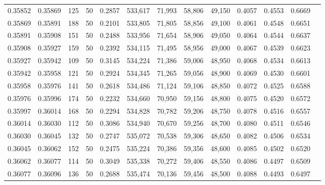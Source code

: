 \begin{tabular}{rrrrrrrrrrrrr}
0.35852 & 0.35869 &   125 &  50 &                                     0.2857 & 533,617 &  71,993 &  58,806 &  49,150 & 0.4057 & 0.4553 & 0.6669 \\
0.35869 & 0.35891 &   188 &  50 &                                     0.2101 & 533,805 &  71,805 &  58,856 &  49,100 & 0.4061 & 0.4548 & 0.6651 \\
0.35891 & 0.35908 &   151 &  50 &                                     0.2488 & 533,956 &  71,654 &  58,906 &  49,050 & 0.4064 & 0.4544 & 0.6637 \\
0.35908 & 0.35927 &   159 &  50 &                                     0.2392 & 534,115 &  71,495 &  58,956 &  49,000 & 0.4067 & 0.4539 & 0.6623 \\
0.35927 & 0.35942 &   109 &  50 &                                     0.3145 & 534,224 &  71,386 &  59,006 &  48,950 & 0.4068 & 0.4534 & 0.6613 \\
0.35942 & 0.35958 &   121 &  50 &                                     0.2924 & 534,345 &  71,265 &  59,056 &  48,900 & 0.4069 & 0.4530 & 0.6601 \\
0.35958 & 0.35976 &   141 &  50 &                                     0.2618 & 534,486 &  71,124 &  59,106 &  48,850 & 0.4072 & 0.4525 & 0.6588 \\
0.35976 & 0.35996 &   174 &  50 &                                     0.2232 & 534,660 &  70,950 &  59,156 &  48,800 & 0.4075 & 0.4520 & 0.6572 \\
0.35997 & 0.36014 &   168 &  50 &                                     0.2294 & 534,828 &  70,782 &  59,206 &  48,750 & 0.4078 & 0.4516 & 0.6557 \\
0.36014 & 0.36030 &   112 &  50 &                                     0.3086 & 534,940 &  70,670 &  59,256 &  48,700 & 0.4080 & 0.4511 & 0.6546 \\
0.36030 & 0.36045 &   132 &  50 &                                     0.2747 & 535,072 &  70,538 &  59,306 &  48,650 & 0.4082 & 0.4506 & 0.6534 \\
0.36045 & 0.36062 &   152 &  50 &                                     0.2475 & 535,224 &  70,386 &  59,356 &  48,600 & 0.4085 & 0.4502 & 0.6520 \\
0.36062 & 0.36077 &   114 &  50 &                                     0.3049 & 535,338 &  70,272 &  59,406 &  48,550 & 0.4086 & 0.4497 & 0.6509 \\
0.36077 & 0.36096 &   136 &  50 &                                     0.2688 & 535,474 &  70,136 &  59,456 &  48,500 & 0.4088 & 0.4493 & 0.6497 \\

\end{tabular}
